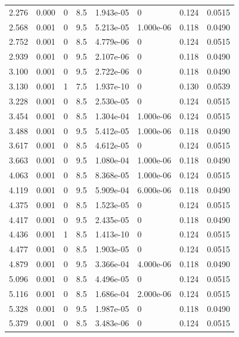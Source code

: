 \documentclass[preview]{standalone}
\begin{document}
{{\begin{tabular}{L{1.2cm}C{1.2cm} C{0.3cm}C{0.5cm} C{1.4cm}C{1.4cm} C{1.4cm}C{1.4cm}}
  2.276  &  0.000  & 0     & 8.5 &  1.943e-05  & 0  & 0.124 &  0.0515   \\ 
  2.568  &  0.001  & 0     & 9.5 &  5.213e-05  & 1.000e-06  & 0.118 &  0.0490   \\ 
  2.752  &  0.001  & 0     & 8.5 &  4.779e-06  & 0  & 0.124 &  0.0515   \\ 
  2.939  &  0.001  & 0     & 9.5 &  2.107e-06  & 0  & 0.118 &  0.0490   \\ 
  3.100  &  0.001  & 0     & 9.5 &  2.722e-06  & 0  & 0.118 &  0.0490   \\ 
  3.130  &  0.001  & 1     & 7.5 &  1.937e-10  & 0  & 0.130 &  0.0539   \\ 
  3.228  &  0.001  & 0     & 8.5 &  2.530e-05  & 0  & 0.124 &  0.0515   \\ 
  3.454  &  0.001  & 0     & 8.5 &  1.304e-04  & 1.000e-06  & 0.124 &  0.0515   \\ 
  3.488  &  0.001  & 0     & 9.5 &  5.412e-05  & 1.000e-06  & 0.118 &  0.0490   \\ 
  3.617  &  0.001  & 0     & 8.5 &  4.612e-05  & 0  & 0.124 &  0.0515   \\ 
  3.663  &  0.001  & 0     & 9.5 &  1.080e-04  & 1.000e-06  & 0.118 &  0.0490   \\ 
  4.063  &  0.001  & 0     & 8.5 &  8.368e-05  & 1.000e-06  & 0.124 &  0.0515   \\ 
  4.119  &  0.001  & 0     & 9.5 &  5.909e-04  & 6.000e-06  & 0.118 &  0.0490   \\ 
  4.375  &  0.001  & 0     & 8.5 &  1.523e-05  & 0  & 0.124 &  0.0515   \\ 
  4.417  &  0.001  & 0     & 9.5 &  2.435e-05  & 0  & 0.118 &  0.0490   \\ 
  4.436  &  0.001  & 1     & 8.5 &  1.413e-10  & 0  & 0.124 &  0.0515   \\ 
  4.477  &  0.001  & 0     & 8.5 &  1.903e-05  & 0  & 0.124 &  0.0515   \\ 
  4.879  &  0.001  & 0     & 9.5 &  3.366e-04  & 4.000e-06  & 0.118 &  0.0490   \\ 
  5.096  &  0.001  & 0     & 8.5 &  4.496e-05  & 0  & 0.124 &  0.0515   \\ 
  5.116  &  0.001  & 0     & 8.5 &  1.686e-04  & 2.000e-06  & 0.124 &  0.0515   \\ 
  5.328  &  0.001  & 0     & 9.5 &  1.987e-05  & 0  & 0.118 &  0.0490   \\ 
  5.379  &  0.001  & 0     & 8.5 &  3.483e-06  & 0  & 0.124 &  0.0515   \\ 

\end{tabular}}}
\end{document}

